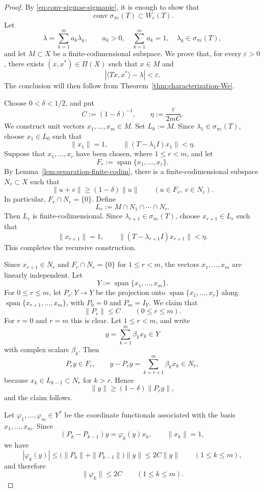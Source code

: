 \documentclass[11pt]{amsart}
\numberwithin{equation}{section}
\theoremstyle{definition}
\theoremstyle{remark}
\begin{document}
\begin{proof}
By \eqref{eq:conv-sigmae-sigmapie}, it is enough to show that
\[
        \operatorname{conv}\sigma_{\pi e}(T)\subset W_e(T).
\]
Let
\[
        \lambda=\sum_{k=1}^m a_k\lambda_k,
        \qquad
        a_k>0,\quad \sum_{k=1}^m a_k=1,\quad
        \lambda_k\in\sigma_{\pi e}(T),
\]
and let \(M\subset X\) be a finite-codimensional subspace. We prove that,
for every \(\varepsilon>0\), there exists \((x,x^*)\in\Pi(X)\) such that
\(x\in M\) and
\[
        |\langle Tx,x^*\rangle-\lambda|<\varepsilon .
\]
The conclusion will then follow from
Theorem~\ref{thm:characterization-We}.

Choose \(0<\delta<1/2\), and put
\[
        C:=(1-\delta)^{-1},
        \qquad
        \eta:=\frac{\varepsilon}{2mC}.
\]
We construct unit vectors \(x_1,\ldots,x_m\in M\). Set \(L_0:=M\). Since
\(\lambda_1\in\sigma_{\pi e}(T)\), choose \(x_1\in L_0\) such that
\[
        \|x_1\|=1,
        \qquad
        \|(T-\lambda_1I)x_1\|<\eta .
\]
Suppose that \(x_1,\ldots,x_r\) have been chosen, where \(1\le r<m\), and
let
\[
        F_r:=\operatorname{span}\{x_1,\ldots,x_r\}.
\]
By Lemma~\ref{lem:separation-finite-codim}, there is a finite-codimensional
subspace \(N_r\subset X\) such that
\[
        \|u+v\|\ge (1-\delta)\|u\|
        \qquad (u\in F_r,\ v\in N_r).
\]
In particular, \(F_r\cap N_r=\{0\}\). Define
\[
        L_r:=M\cap N_1\cap\cdots\cap N_r .
\]
Then \(L_r\) is finite-codimensional. Since
\(\lambda_{r+1}\in\sigma_{\pi e}(T)\), choose \(x_{r+1}\in L_r\) such that
\[
        \|x_{r+1}\|=1,
        \qquad
        \|(T-\lambda_{r+1}I)x_{r+1}\|<\eta .
\]
This completes the recursive construction.

Since \(x_{r+1}\in N_r\) and \(F_r\cap N_r=\{0\}\) for \(1\le r<m\), the
vectors \(x_1,\ldots,x_m\) are linearly independent. Let
\[
        Y:=\operatorname{span}\{x_1,\ldots,x_m\}.
\]
For \(0\le r\le m\), let \(P_r:Y\to Y\) be the projection onto
\(\operatorname{span}\{x_1,\ldots,x_r\}\) along
\(\operatorname{span}\{x_{r+1},\ldots,x_m\}\), with \(P_0=0\) and \(P_m=I_Y\).
We claim that
\[
        \|P_r\|\le C \qquad (0\le r\le m).
\]
For \(r=0\) and \(r=m\) this is clear. Let \(1\le r<m\), and write
\[
        y=\sum_{k=1}^m \beta_kx_k\in Y
\]
with complex scalars \(\beta_k\). Then
\[
        P_ry\in F_r,
        \qquad
        y-P_ry=\sum_{k=r+1}^m \beta_kx_k\in N_r,
\]
because \(x_k\in L_{k-1}\subset N_r\) for \(k>r\). Hence
\[
        \|y\|\ge (1-\delta)\|P_ry\|,
\]
and the claim follows.

Let \(\varphi_1,\ldots,\varphi_m\in Y^*\) be the coordinate functionals
associated with the basis \(x_1,\ldots,x_m\). Since
\[
        (P_k-P_{k-1})y=\varphi_k(y)x_k,
        \qquad \|x_k\|=1,
\]
we have
\[
        |\varphi_k(y)|
        \le
        \bigl(\|P_k\|+\|P_{k-1}\|\bigr)\|y\|
        \le 2C\|y\|
        \qquad (1\le k\le m),
\]
and therefore
\[
        \|\varphi_k\|\le 2C
        \qquad (1\le k\le m).
\]


\end{proof}
\end{document}
